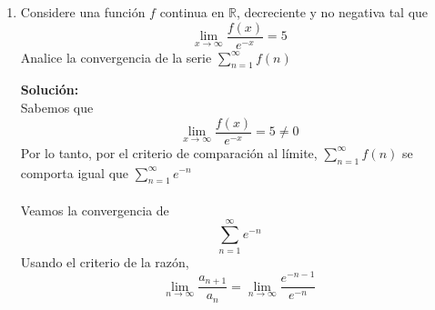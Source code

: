 \documentclass[12pt]{article}
\newenvironment{solucion}
{\begin{mdframed}[backgroundcolor=black!10]
		{\bf Solución:}\\
	}
	{
	\end{mdframed}
}
\newenvironment{preguntas}
{\begin{enumerate}\itemsep12pt
	}
	{
	\end{enumerate}
}
\newcommand{\ev}{\Big|}
\newcommand{\ra}{\rightarrow}
\newcommand{\R}{\mathbb{R}}
\begin{document}
\begin{preguntas}
\begin{solucion}
\begin{enumerate}[a)]
			\\
			Veamos ahora que pasa con $\sum\limits_{n=2}^{\infty} \dfrac{1}{nln(n)}$. Usando el criterio de la integral, tenemos que la serie se comportara igual a $\displaystyle\int_2^{\infty} \dfrac{1}{xln(x)}$. \\
			\\
			Calculemos entonces esta integral impropia,
			$$\displaystyle\int_2^{\infty} \dfrac{1}{xln(x)} =  ln(ln(x)) \ev_2^{\infty} = \infty$$
			Luego, $\displaystyle\int_2^{\infty} \dfrac{1}{xln(x)}$ diverge, por lo que por criterio de la integral, $\sum\limits_{n=2}^{\infty} \dfrac{1}{nln(n)}$ tambiém diverge. Finalmente, por el criterio de comparación al limite, la serie $\sum\limits_{n=2}^{\infty}\dfrac{n}{(n+1)^2ln(n)}$ es divergente.
\item $\sum\limits_{n=1}^{\infty}\dfrac{n!}{n^n}$\\
			\\
			Recordemos que en el infinito,
			$$n^n > n! > a^n > n > ln(n)$$
			El límite de la sucesión es
			$$\lim\limits_{n\ra\infty}\dfrac{n!}{n^n} = 0$$
			Usando el criterio de la razón,
			$$\lim\limits_{n \ra \infty} \dfrac{a_{n+1}}{a_n}
			= \lim\limits_{n \ra \infty} \dfrac{\dfrac{(n+1)!}{(n+1)^{n+1}}}{\dfrac{n!}{n^n}}
			= \lim\limits_{n \ra \infty} \dfrac{(n+1)!}{n!}\dfrac{n^n}{(n+1)^{n+1}}$$
			$$= \lim\limits_{n \ra \infty} \dfrac{(n+1)}{1}\dfrac{n^n}{(n+1)^{n+1}}
			= \lim\limits_{n \ra \infty} \dfrac{n^n}{(n+1)^{n}}
			= \lim\limits_{n \ra \infty} \left(\dfrac{n}{n+1}\right)^n$$
			$$= \lim\limits_{n \ra \infty} \dfrac{1}{\left(\dfrac{n+1}{n}\right)^n}
			= \dfrac{1}{e} < 1$$
			Por criterio de la razón, la serie es convergente.
\end{enumerate}
\end{solucion}
\item Considere una función $f$ continua en $\R$, decreciente y no negativa tal que
	$$\lim_{x\ra\infty}\dfrac{f(x)}{e^{-x}}=5$$
	Analice la convergencia de la serie $\sum\limits_{n=1}^{\infty}f(n)$
\begin{solucion}
Sabemos que
		$$\lim_{x\ra\infty}\dfrac{f(x)}{e^{-x}}=5 \neq 0$$
		Por lo tanto, por el criterio de comparación al límite, $\sum\limits_{n=1}^{\infty}f(n)$ se comporta igual que $\sum\limits_{n=1}^{\infty}e^{-n}$\\
		\\
		Veamos la convergencia de 
		$$\sum\limits_{n=1}^{\infty}e^{-n}$$
		Usando el criterio de la razón,
		$$\lim\limits_{n \ra \infty} \dfrac{a_{n+1}}{a_n}
		= \lim\limits_{n \ra \infty} \dfrac{e^{-n-1}}{e^{-n}}
$$
\end{solucion}
\end{preguntas}
\end{document}
